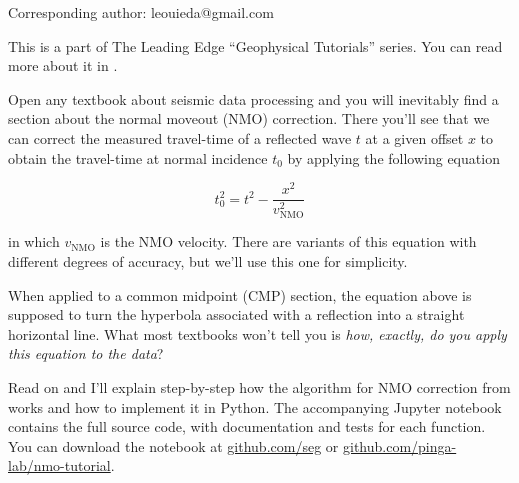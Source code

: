 Corresponding author: leouieda@gmail.com

This is a part of The Leading Edge ``Geophysical Tutorials'' series.
You can read more about it in \citet{Hall_2016a}.

Open any textbook about seismic data processing and you will inevitably find a
section about the normal moveout (NMO) correction.
There you'll see that we can correct the measured travel-time of a reflected
wave $t$ at a given offset $x$ to obtain the travel-time at normal
incidence $t_0$ by applying the following equation

\begin{equation}
t_0^2=t^2-\dfrac{x^2}{v_\mathrm{NMO}^2}
\label{eq:traveltime}
\end{equation}

in which $v_\mathrm{NMO}$ is the NMO velocity.
There are variants of this equation with different degrees of accuracy,
but we'll use this one for simplicity.

When applied to a common midpoint (CMP) section, the equation above is
supposed to turn the hyperbola associated with a reflection into a straight
horizontal line.
What most textbooks won't tell you is \textit{how, exactly, do you apply this
equation to the data}?

Read on and I'll explain step-by-step how the algorithm for NMO correction from
\citet{Yilmaz_2001} works and how to implement it in Python.
The accompanying Jupyter notebook \citep{Perez_2007} contains the full source
code, with documentation and tests for each function.
You can download the notebook at
\href{https://github.com/seg}{github.com/seg} or
\href{https://github.com/pinga-lab/nmo-tutorial}{github.com/pinga-lab/nmo-tutorial}.
